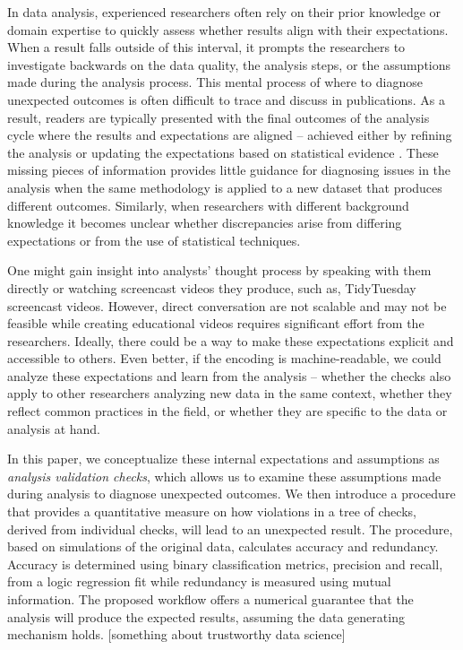 \documentclass[
  12pt,
]{interact}
\begin{document}
In data analysis, experienced researchers often rely on their prior
knowledge or domain expertise to quickly assess whether results align
with their expectations. When a result falls outside of this interval,
it prompts the researchers to investigate backwards on the data quality,
the analysis steps, or the assumptions made during the analysis process.
This mental process of where to diagnose unexpected outcomes is often
difficult to trace and discuss in publications. As a result, readers are
typically presented with the final outcomes of the analysis cycle where
the results and expectations are aligned -- achieved either by refining
the analysis or updating the expectations based on statistical evidence
\citep{grolemund_cognitive_2014}. These missing pieces of information
provides little guidance for diagnosing issues in the analysis when the
same methodology is applied to a new dataset that produces different
outcomes. Similarly, when researchers with different background
knowledge it becomes unclear whether discrepancies arise from differing
expectations or from the use of statistical techniques.

One might gain insight into analysts' thought process by speaking with
them directly or watching screencast videos they produce, such as,
TidyTuesday screencast videos. However, direct conversation are not
scalable and may not be feasible while creating educational videos
requires significant effort from the researchers. Ideally, there could
be a way to make these expectations explicit and accessible to others.
Even better, if the encoding is machine-readable, we could analyze these
expectations and learn from the analysis -- whether the checks also
apply to other researchers analyzing new data in the same context,
whether they reflect common practices in the field, or whether they are
specific to the data or analysis at hand.

In this paper, we conceptualize these internal expectations and
assumptions as \emph{analysis validation checks}, which allows us to
examine these assumptions made during analysis to diagnose unexpected
outcomes. We then introduce a procedure that provides a quantitative
measure on how violations in a tree of checks, derived from individual
checks, will lead to an unexpected result. The procedure, based on
simulations of the original data, calculates accuracy and redundancy.
Accuracy is determined using binary classification metrics, precision
and recall, from a logic regression fit while redundancy is measured
using mutual information. The proposed workflow offers a numerical
guarantee that the analysis will produce the expected results, assuming
the data generating mechanism holds. {[}something about trustworthy data
science{]}
\end{document}
